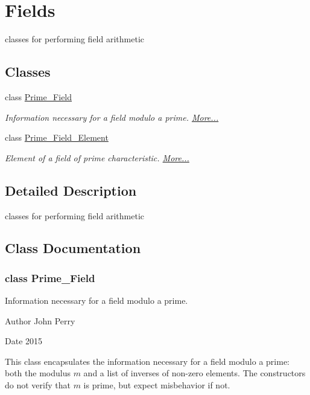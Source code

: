 \hypertarget{group___fields_group}{}\section{Fields}
\label{group___fields_group}


classes for performing field arithmetic  


\subsection*{Classes}
\begin{DoxyCompactItemize}
\item 
class \hyperlink{group___fields_group_class_prime___field}{Prime\+\_\+\+Field}
\begin{DoxyCompactList}\small\item\em Information necessary for a field modulo a prime.  \hyperlink{group___fields_group_class_prime___field}{More...}\end{DoxyCompactList}\item 
class \hyperlink{group___fields_group_class_prime___field___element}{Prime\+\_\+\+Field\+\_\+\+Element}
\begin{DoxyCompactList}\small\item\em Element of a field of prime characteristic.  \hyperlink{group___fields_group_class_prime___field___element}{More...}\end{DoxyCompactList}\end{DoxyCompactItemize}


\subsection{Detailed Description}
classes for performing field arithmetic 



\subsection{Class Documentation}
\label{class_prime___field}
\subsubsection{class Prime\+\_\+\+Field}
Information necessary for a field modulo a prime. 

\begin{DoxyAuthor}{Author}
John Perry 
\end{DoxyAuthor}
\begin{DoxyDate}{Date}
2015
\end{DoxyDate}
This class encapsulates the information necessary for a field modulo a prime\+: both the modulus $m$ and a list of inverses of non-\/zero elements. The constructors do not verify that $m$ is prime, but expect misbehavior if not.

